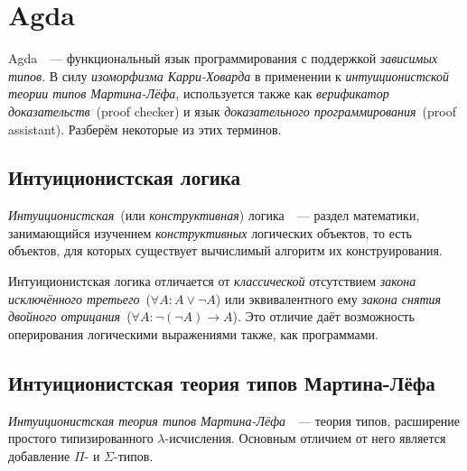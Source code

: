 \section{Agda}

Agda~\cite{agda}~--- функциональный язык программирования с поддержкой
\emph{зависимых типов}. В силу \emph{изоморфизма Карри-Ховарда} в
применении к \emph{интуиционистской теории типов Мартина-Лёфа},
используется также как \emph{верификатор доказательств}~(proof
checker) и язык \emph{доказательного программирования}~(proof assistant).
Разберём некоторые из этих терминов.

\subsection{Интуиционистская логика}

\emph{Интуиционистская}~(или \emph{конструктивная})
логика~\cite{шень2,curryhoward}~--- раздел математики, занимающийся
изучением \emph{конструктивных} логических объектов, то есть объектов,
для которых существует вычислимый алгоритм их конструирования.


Интуиционистская логика отличается от \emph{классической} отсутствием
\emph{закона исключённого третьего}~($\forall A : A \vee \neg A$) или
эквивалентного ему \emph{закона снятия двойного отрицания}~($\forall A
: \neg (\neg A) \to A$). Это отличие даёт возможность оперирования
логическими выражениями также, как программами. %

\subsection{Интуиционистская теория типов Мартина-Лёфа}

\emph{Интуиционистская теория типов Мартина-Лёфа}~\cite{mltt}~---
теория типов, расширение простого типизированного
$\lambda$-исчисления. Основным отличием от него является добавление
$\Pi$- и $\Sigma$-типов.

